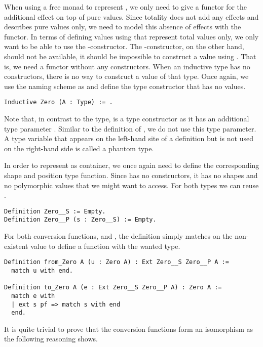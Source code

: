 When using a free monad to represent , we only need to
give a functor for the additional effect on top of pure values.
Since totality does not add any effects and describes pure values
only, we need to model this absence of effects with the functor.
In terms of defining values using  that represent total
values only, we only want to be able to use the
-constructor.
The -constructor, on the other hand, should not be
available, it should be impossible to construct a value using
.
That is, we need a functor without any constructors.
When an inductive type has no constructors, there is no way to
construct a value of that type.
Once again, we use the naming scheme as \citeauthor{swierstra2008data}
and define the type constructor  that has no values.

\begin{verbatim}
Inductive Zero (A : Type) := .
\end{verbatim}

Note that, in contrast to the  type,  is a type
constructor as it has an additional type parameter .
Similar to the definition of , we do not use this type
parameter.
A type variable that appears on the left-hand site of a definition but
is not used on the right-hand side is called a phantom type.

In order to represent  as container, we once again need to
define the corresponding shape and position type function.
Since  has no constructors, it has no shapes and no
polymorphic values that we might want to access.
For both types we can reuse .

\begin{verbatim}
Definition Zero__S := Empty.
Definition Zero__P (s : Zero__S) := Empty.
\end{verbatim}

For both conversion functions,  and ,
the definition simply matches on the non-existent value to define a
function with the wanted type.

\begin{verbatim}
Definition from_Zero A (u : Zero A) : Ext Zero__S Zero__P A :=
  match u with end.

Definition to_Zero A (e : Ext Zero__S Zero__P A) : Zero A :=
  match e with
  | ext s pf => match s with end
  end.
\end{verbatim}

It is quite trivial to prove that the conversion functions form an
isomorphism as the following reasoning shows.

